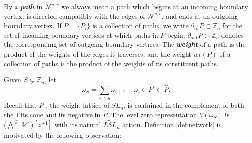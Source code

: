 \documentclass[12pt]{amsart}
\newcommand{\newword}[1]{\textbf{\emph{#1}}}
\newcommand{\ZZ}{\mathbb{Z}}
\newcommand{\kk}{\Bbbk}%
\newcommand{\cN}{\mathcal{N}} %
\theoremstyle{remark}
\numberwithin{equation}{section}
\numberwithin{figure}{section}
\begin{document}
By a \newword{path} in $\cN^{u,v}$ we always mean a path which begins at an incoming boundary vertex, is directed compatibly with the edges of $\cN^{u,v}$, and ends at an outgoing boundary vertex. 
If $P = \{P_i\}$ is a collection of paths, we write $\partial_{in}P \subset \ZZ_n$ for the set of incoming boundary vertices at which paths in $P$ begin; $\partial_{out}P \subset \ZZ_n$ denotes the corresponding set of outgoing boundary vertices. 
The \newword{weight} of a path is the product of the weights of the edges it traverses, and the weight $wt(P)$ of a collection of paths is the product of the weights of its constituent paths.  

Given $S \subsetneq \ZZ_n$, let
\[ \omega_S = \sum_{i \in S} \omega_{i+1} - \omega_i \in P^\circ \subset \widehat{P}.\] 
Recall that $P^\circ$, the weight lattice of $SL_n$, is contained in the complement of both the Tits cone and its negative in $\widehat{P}$. The level zero representation $V(\omega_S)$ is $\big(\bigwedge^{|S|}\kk^n\big)[z^{\pm 1}]$ with its natural $\widetilde{LSL}_n$ action. Definition \ref{def:network} is motivated by the following observation:
\end{document}
